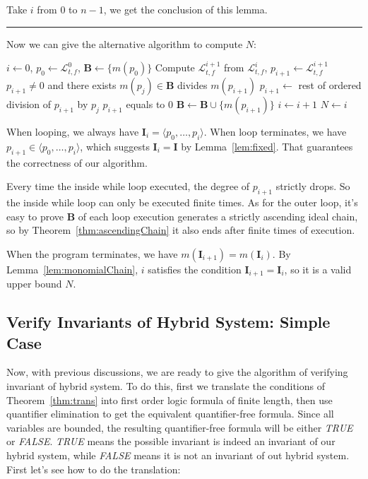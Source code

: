 \documentclass{jssc}
\newcommand{\rulex}{\hfill\rule{1mm}{3mm}}
\begin{document}
Take $i$ from $0$ to $n-1$, we get the conclusion of this lemma.
\rulex \newline

Now we can give the alternative algorithm to compute $N$:

\begin{codebox}
\li 	$i \gets 0$, $p_0 \gets \mathcal{L}_{t, f}^0$, $\boldsymbol{B} \gets \{ m(p_0) \}$
\li 	\While {}
\li		\Do
			Compute $\mathcal{L}_{t, f}^{i+1}$ from $\mathcal{L}_{t, f}^i$, $p_{i+1} \gets \mathcal{L}_{t, f}^{i+1}$
\li			\While $p_{i+1} \neq 0$ and there exists $m(p_j) \in \boldsymbol{B}$ divides $m(p_{i+1})$
\li				\Do
					$p_{i+1} \gets$ rest of ordered division of $p_{i+1}$ by $p_j$
				\End
\li			\If $p_{i+1}$ equals to $0$
\li				\Then
				\End
\li			$\boldsymbol{B} \gets \boldsymbol{B} \cup \{ m(p_{i+1}) \}$
\li			$i \gets i+1$
		\End
\li	$N \gets i$
\end{codebox}

When looping, we always have $\boldsymbol{I}_i = \langle p_0, \dots, p_i \rangle$. When loop terminates, we have $p_{i+1} \in \langle p_0, \dots, p_i \rangle$, which suggests $\boldsymbol{I}_i = \boldsymbol{I}$ by Lemma~\ref{lem:fixed}. That guarantees the correctness of our algorithm.

Every time the inside while loop executed, the degree of $p_{i+1}$ strictly drops. So the inside while loop can only be executed finite times. As for the outer loop, it's easy to prove $\boldsymbol{B}$ of each loop execution generates a strictly ascending ideal chain, so by Theorem~\ref{thm:ascendingChain} it also ends after finite times of execution.

When the program terminates, we have $m(\boldsymbol{I}_{i+1}) = m(\boldsymbol{I}_i)$. By Lemma~\ref{lem:monomialChain}, $i$ satisfies the condition $\boldsymbol{I}_{i+1} = \boldsymbol{I}_i$, so it is a valid upper bound $N$.

\subsection{Verify Invariants of Hybrid System: Simple Case}
Now, with previous discussions, we are ready to give the algorithm of verifying invariant of hybrid system. To do this, first we translate the conditions of Theorem~\ref{thm:trans} into first order logic formula of finite length, then use quantifier elimination to get the equivalent quantifier-free formula. Since all variables are bounded, the resulting quantifier-free formula will be either \emph{TRUE} or \emph{FALSE}. \emph{TRUE} means the possible invariant is indeed an invariant of our hybrid system, while \emph{FALSE} means it is not an invariant of out hybrid system. First let's see how to do the translation:
\end{document}
